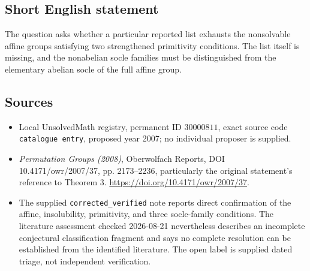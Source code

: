 \documentclass[11pt]{article}
\begin{document}
\subsection{Short English statement}
The question asks whether a particular reported list exhausts the nonsolvable affine groups satisfying two strengthened primitivity conditions. The list itself is missing, and the nonabelian socle families must be distinguished from the elementary abelian socle of the full affine group.
\subsection{Sources}
\begin{itemize}
\item Local UnsolvedMath registry, permanent ID \(30000811\), exact source code \texttt{catalogue entry}, proposed year 2007; no individual proposer is supplied.
\item \emph{Permutation Groups (2008)}, Oberwolfach Reports, DOI 10.4171/owr/2007/37, pp. 2173--2236, particularly the original statement's reference to Theorem 3. \url{https://doi.org/10.4171/owr/2007/37}.
\item The supplied \texttt{corrected\_verified} note reports direct confirmation of the affine, insolubility, primitivity, and three socle-family conditions. The literature assessment checked 2026-08-21 nevertheless describes an incomplete conjectural classification fragment and says no complete resolution can be established from the identified literature. The open label is supplied dated triage, not independent verification.
\end{itemize}
\end{document}
